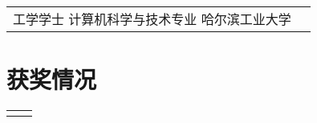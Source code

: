 \documentclass[10pt]{article} %
\begin{document}
\begin{paracol}{2}




\begin{supertabular}{rl} %

	
	{工学学士} %
	{} %
	{计算机科学与技术专业} %
	{哈尔滨工业大学} %
	

\end{supertabular}


\section{获奖情况}





\begin{supertabular}{rl} %
	
	
	

\end{supertabular}
\end{paracol}
\end{document}
